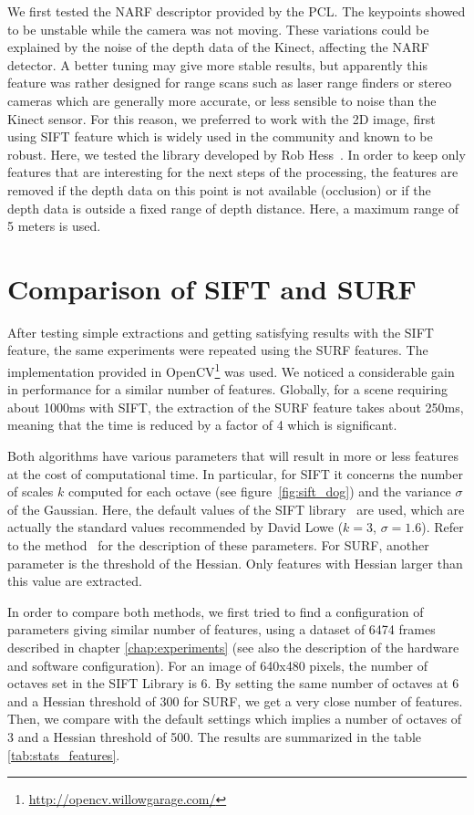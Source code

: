We first tested the \gls{NARF} descriptor provided by the \gls{PCL}. The keypoints showed to be unstable while the camera was not moving. These variations could be explained by the noise of the depth data of the Kinect, affecting the \gls{NARF} detector. A better tuning may give more stable results, but apparently this feature was rather designed for range scans such as laser range finders or stereo cameras which are generally more accurate, or less sensible to noise than the Kinect sensor. For this reason, we preferred to work with the 2D image, first using \gls{SIFT} feature which is widely used in the community and known to be robust. Here, we tested the library developed by Rob Hess~\cite{hess_sift}. In order to keep only features that are interesting for the next steps of the processing, the features are removed if the depth data on this point is not available (occlusion) or if the depth data is outside a fixed range of depth distance. Here, a maximum range of 5 meters is used.

\clearpage
\section{Comparison of SIFT and SURF}
After testing simple extractions and getting satisfying results with the \gls{SIFT} feature, the same experiments were repeated using the \gls{SURF} features. The implementation provided in OpenCV\footnote{\url{http://opencv.willowgarage.com/}} was used. We noticed a considerable gain in performance for a similar number of features. Globally, for a scene requiring about 1000ms with \gls{SIFT}, the extraction of the \gls{SURF} feature takes about 250ms, meaning that the time is reduced by a factor of 4 which is significant.

Both algorithms have various parameters that will result in more or less features at the cost of computational time. In particular, for \gls{SIFT} it concerns the number of scales $k$ computed for each octave (see figure~\ref{fig:sift_dog}) and the variance $\sigma$ of the Gaussian. Here, the default values of the \gls{SIFT} library~\cite{hess_sift} are used, which are actually the standard values recommended by David Lowe ($k=3$, $\sigma=1.6$). Refer to the method~\cite{lowe_2004_sift} for the description of these parameters. For \gls{SURF}, another parameter is the threshold of the Hessian. Only features with Hessian larger than this value are extracted.

In order to compare both methods, we first tried to find a configuration of parameters giving similar number of features, using a dataset of 6474 frames described in chapter \ref{chap:experiments} (see also the description of the hardware and software configuration). For an image of 640x480 pixels, the number of octaves set in the SIFT Library is 6. By setting the same number of octaves at 6 and a Hessian threshold of 300 for \gls{SURF}, we get a very close number of features. Then, we compare with the default settings which implies a number of octaves of 3 and a Hessian threshold of 500. The results are summarized in the table \ref{tab:stats_features}.

